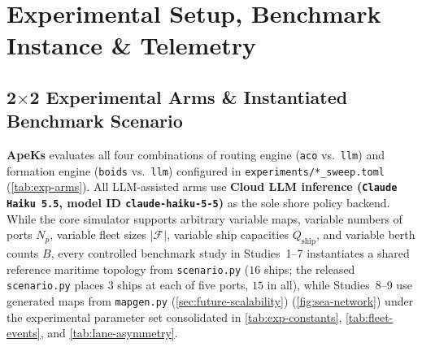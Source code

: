 \documentclass[11pt,a4paper,oneside]{report}
\begin{document}
\parindent0pt

\section[Setup \& Benchmark Instance]{Experimental Setup, Benchmark Instance \& Telemetry}

\subsection{\texorpdfstring{2$\times$2}{2x2} Experimental Arms \& Instantiated Benchmark Scenario}
\begin{sloppypar}
\textbf{ApeKs} evaluates all four combinations of routing engine (\texttt{aco} vs.\ \texttt{llm}) and formation engine (\texttt{boids} vs.\ \texttt{llm}) configured in \texttt{experiments/*\_sweep.toml} (\autoref{tab:exp-arms}). All LLM-assisted arms use \textbf{Cloud LLM inference (\texttt{Claude Haiku 5.5}, model ID \texttt{claude-haiku-5-5})} as the sole shore policy backend. While the core simulator supports arbitrary variable maps, variable numbers of ports $N_p$, variable fleet sizes $|\mathcal{F}|$, variable ship capacities $Q_{\text{ship}}$, and variable berth counts $B$, every controlled benchmark study in Studies~1--7 instantiates a shared reference maritime topology from \texttt{scenario.py} ($16$ ships; the released \texttt{scenario.py} places $3$ ships at each of five ports, $15$ in all), while Studies~8--9 use generated maps from \texttt{mapgen.py} (\autoref{sec:future-scalability}) (\autoref{fig:sea-network}) under the experimental parameter set consolidated in \autoref{tab:exp-constants}, \autoref{tab:fleet-events}, and \autoref{tab:lane-asymmetry}.
\end{sloppypar}
\end{document}
